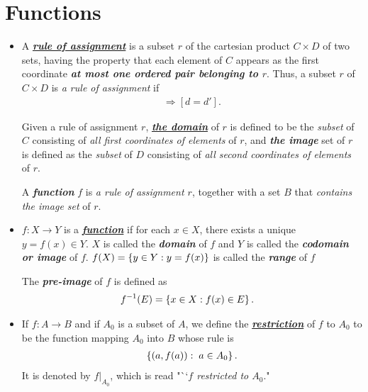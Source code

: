 \documentclass[11pt]{article}
\begin{document}
\section{Functions}
\begin{itemize}
\item \begin{definition}
A \underline{\emph{\textbf{rule of assignment}}} is a subset $r$ of the cartesian product $C \times D$ of two sets, having the property that each element of $C$ appears as the first coordinate  \emph{\textbf{at most one ordered pair belonging to $r$}}. Thus, a subset $r$ of $C \times D$ is \emph{a rule of assignment} if
\begin{align*}
[(c, d) \in r\text{ and }(c, d') \in r] \Rightarrow [d = d'].
\end{align*}

Given a rule of assignment $r$, \underline{\emph{\textbf{the domain}}} of $r$ is defined to be the \emph{subset} of $C$ consisting of \emph{all first coordinates of elements} of $r$, and \emph{\textbf{the image}} set of $r$ is defined as the \emph{subset} of $D$ consisting of \emph{all second coordinates of elements} of $r$.

A \emph{\textbf{function}} $f$ is \emph{a rule of assignment $r$}, together with a set $B$ that \emph{contains the image set} of $r$.
\end{definition}

\item \begin{definition} 
$f: X\rightarrow Y$ is a \underline{\emph{\textbf{function}}} if for each $x \in X$, there exists a unique $y = f(x) \in Y$. $X$ is called the \emph{\textbf{domain}} of $f$ and $Y$ is called the  \emph{\textbf{codomain or image}} of $f$. $f(X) = \left\{y \in Y: y = f(x)\right\}$ is called the \emph{\textbf{range}} of $f$

The \emph{\textbf{pre-image}} of $f$ is defined as
\begin{align*}
f^{-1}(E) &= \left\{x \in X: f(x) \in E\right\}.
\end{align*}
\end{definition}

\item \begin{definition}
If $f: A \rightarrow B$ and if $A_0$ is a subset of $A$, we define the \underline{\emph{\textbf{restriction}}} of $f$ to $A_0$ to be the function mapping $A_0$ into $B$ whose rule is
\begin{align*}
\left\{(a, f(a)): \; a\in A_0\right\}.
\end{align*}
It is denoted by $f|_{A_0}$, which is read "``\emph{$f$ restricted to $A_0$}."
\end{definition}


\end{itemize}
\end{document}

